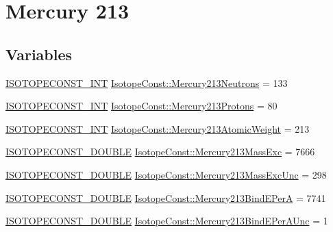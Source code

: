\hypertarget{group___isotope_const-_mercury-_hg213}{}\section{Mercury 213}
\label{group___isotope_const-_mercury-_hg213}
\subsection*{Variables}
\begin{DoxyCompactItemize}
\item 
\mbox{\hyperlink{group___isotope_const-_macros_ga5f18360b3e99483a35c32d789e62621c}{I\+S\+O\+T\+O\+P\+E\+C\+O\+N\+S\+T\+\_\+\+I\+NT}} \mbox{\hyperlink{group___isotope_const-_mercury-_hg213_ga74a5491dc4ed3c2840c2fe99a65b7a6e}{Isotope\+Const\+::\+Mercury213\+Neutrons}} = 133
\item 
\mbox{\hyperlink{group___isotope_const-_macros_ga5f18360b3e99483a35c32d789e62621c}{I\+S\+O\+T\+O\+P\+E\+C\+O\+N\+S\+T\+\_\+\+I\+NT}} \mbox{\hyperlink{group___isotope_const-_mercury-_hg213_ga4c6e4d109f717e7e306521d815e3abb9}{Isotope\+Const\+::\+Mercury213\+Protons}} = 80
\item 
\mbox{\hyperlink{group___isotope_const-_macros_ga5f18360b3e99483a35c32d789e62621c}{I\+S\+O\+T\+O\+P\+E\+C\+O\+N\+S\+T\+\_\+\+I\+NT}} \mbox{\hyperlink{group___isotope_const-_mercury-_hg213_ga9c8a8e92a1e71803a03fca4b819ef6a7}{Isotope\+Const\+::\+Mercury213\+Atomic\+Weight}} = 213
\item 
\mbox{\hyperlink{group___isotope_const-_macros_ga8f45a7272ce02c0b4c65c44636ed719a}{I\+S\+O\+T\+O\+P\+E\+C\+O\+N\+S\+T\+\_\+\+D\+O\+U\+B\+LE}} \mbox{\hyperlink{group___isotope_const-_mercury-_hg213_ga7016fce1d8637ceaa5c65c9c4dd49ef5}{Isotope\+Const\+::\+Mercury213\+Mass\+Exc}} = 7666
\item 
\mbox{\hyperlink{group___isotope_const-_macros_ga8f45a7272ce02c0b4c65c44636ed719a}{I\+S\+O\+T\+O\+P\+E\+C\+O\+N\+S\+T\+\_\+\+D\+O\+U\+B\+LE}} \mbox{\hyperlink{group___isotope_const-_mercury-_hg213_ga5ec4446e595d22c5239608055bf6a8e7}{Isotope\+Const\+::\+Mercury213\+Mass\+Exc\+Unc}} = 298
\item 
\mbox{\hyperlink{group___isotope_const-_macros_ga8f45a7272ce02c0b4c65c44636ed719a}{I\+S\+O\+T\+O\+P\+E\+C\+O\+N\+S\+T\+\_\+\+D\+O\+U\+B\+LE}} \mbox{\hyperlink{group___isotope_const-_mercury-_hg213_gaef710d3d7deb46e1b1b558c0f4dcf3aa}{Isotope\+Const\+::\+Mercury213\+Bind\+E\+PerA}} = 7741
\item 
\mbox{\hyperlink{group___isotope_const-_macros_ga8f45a7272ce02c0b4c65c44636ed719a}{I\+S\+O\+T\+O\+P\+E\+C\+O\+N\+S\+T\+\_\+\+D\+O\+U\+B\+LE}} \mbox{\hyperlink{group___isotope_const-_mercury-_hg213_gaf625bcba8ec3f501b7c18e40ede32c03}{Isotope\+Const\+::\+Mercury213\+Bind\+E\+Per\+A\+Unc}} = 1

\end{DoxyCompactItemize}
